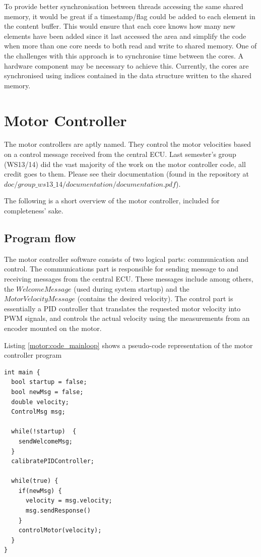 To provide better synchronisation between threads accessing the same shared memory, it would be great if a timestamp/flag could be added to each element in the content buffer. This would ensure that each core knows how many new elements have been added since it last accessed the area and simplify the code when more than one core needs to both read and write to shared memory. One of the challenges with this approach is to synchronise time between the cores. A hardware component may be necessary to achieve this. Currently, the cores are synchronised using indices contained in the data structure written to the shared memory. 

\section{Motor Controller}
The motor controllers are aptly named. They control the motor velocities based on a control message received from the central ECU. Last semester's group (WS13/14) did the vast majority of the work on the motor controller code, all credit goes to them. Please see their documentation (found in the repository at $doc/group\_ws13\_14/documentation/documentation.pdf$). 

The following is a short overview of the motor controller, included for completeness' sake.

\subsection{Program flow}
The motor controller software consists of two logical parts: communication and control. The communications part is responsible for sending message to and receiving messages from the central ECU. These messages include among others, the $WelcomeMessage$ (used during system startup) and the $MotorVelocityMessage$ (contains the desired velocity). The control part is essentially a PID controller that translates the requested motor velocity into PWM signals, and controls the actual velocity using the measurements from an encoder mounted on the motor.

Listing \ref{motor:code_mainloop} shows a pseudo-code representation of the motor controller program

\begin{lstlisting}[label=motor:code_mainloop]
int main {
  bool startup = false;
  bool newMsg = false;
  double velocity;
  ControlMsg msg;

  while(!startup)  {
    sendWelcomeMsg;
  }
  calibratePIDController;
  
  while(true) {
    if(newMsg) {
      velocity = msg.velocity;
      msg.sendResponse()
    }
    controlMotor(velocity);
  }
}
\end{lstlisting}

